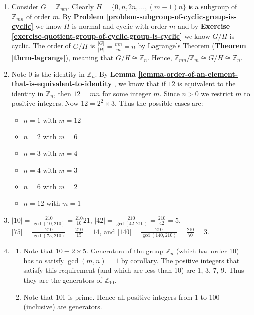 \begin{enumerate}
    \item Consider $G = \mathbb{Z}_{mn}$. Clearly $H = \{0, n, 2n, \dots, (m-1)n\}$ is a subgroup of $\mathbb{Z}_{mn}$ of order $m$. By \textbf{Problem \ref{problem-subgroup-of-cyclic-group-is-cyclic}} we know $H$ is normal and cyclic with order $m$ and by \textbf{Exercise \ref{exercise-quotient-group-of-cyclic-group-is-cyclic}} we know $G/H$ is cyclic. The order of $G/H$ is $\frac{|G|}{|H|} = \frac{mn}{m} = n$ by Lagrange's Theorem (\textbf{Theorem \ref{thrm-lagrange}}), meaning that $G/H \cong \mathbb{Z}_n$. Hence, $\mathbb{Z}_{mn}/\mathbb{Z}_m \cong G/H \cong \mathbb{Z}_n$.
    
    \item Note 0 is the identity in $\mathbb{Z}_n$. By \textbf{Lemma \ref{lemma-order-of-an-element-that-is-equivalent-to-identity}}, we know that if $12$ is equivalent to the identity in $\mathbb{Z}_n$, then $12 = mn$ for some integer $m$. Since $n > 0$ we restrict $m$ to positive integers. Now $12 = 2^2 \times 3$. Thus the possible cases are:
    \begin{itemize}
        \item $n = 1$ with $m = 12$
        \item $n = 2$ with $m = 6$
        \item $n = 3$ with $m = 4$
        \item $n = 4$ with $m = 3$
        \item $n = 6$ with $m = 2$
        \item $n = 12$ with $m = 1$
    \end{itemize}

    \item $|10| = \frac{210}{\gcd(10, 210)} = \frac{210}{10} 21$, $|42| = \frac{210}{\gcd(42, 210)} = \frac{210}{42} = 5$, $|75| = \frac{210}{\gcd(75, 210)} = \frac{210}{15} = 14$, and $|140| = \frac{210}{\gcd(140, 210)} = \frac{210}{70} = 3$.

    \item \begin{enumerate}[label=(\alph*)]
        \item Note that $10 = 2 \times 5$. Generators of the group $\mathbb{Z}_n$ (which has order 10) has to satisfy $\gcd(m,n) = 1$ by corollary. The positive integers that satisfy this requirement (and which are less than 10) are 1, 3, 7, 9. Thus they are the generators of $\mathbb{Z}_10$.
        \item Note that 101 is prime. Hence all positive integers from 1 to 100 (inclusive) are generators.
    \end{enumerate}


\end{enumerate}
